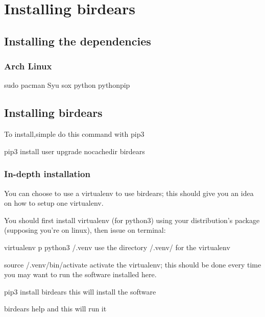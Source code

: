 \documentclass[letterpaper,10pt,english]{sphinxmanual}
\begin{document}
\chapter{Installing birdears}
\label{\detokenize{installing::doc}}\label{\detokenize{installing:installing-birdears}}

\section{Installing the dependencies}
\label{\detokenize{installing:installing-the-dependencies}}

\subsection{Arch Linux}
\label{\detokenize{installing:arch-linux}}
\begin{sphinxVerbatim}[commandchars=\\\{\}]
sudo pacman \PYGZhy{}Syu sox python python\PYGZhy{}pip
\end{sphinxVerbatim}


\section{Installing birdears}
\label{\detokenize{installing:id1}}
To install,simple do this command with pip3

\begin{sphinxVerbatim}[commandchars=\\\{\}]
pip3 install \PYGZhy{}\PYGZhy{}user \PYGZhy{}\PYGZhy{}upgrade \PYGZhy{}\PYGZhy{}no\PYGZhy{}cache\PYGZhy{}dir birdears
\end{sphinxVerbatim}


\subsection{In-depth installation}
\label{\detokenize{installing:in-depth-installation}}
You can choose to use a virtualenv to use birdears; this should give you
an idea on how to setup one virtualenv.

You should first install virtualenv (for python3) using your
distribution’s package (supposing you’re on linux), then issue on terminal:

\begin{sphinxVerbatim}[commandchars=\\\{\}]
virtualenv \PYGZhy{}p python3 \PYGZti{}/.venv \PYGZsh{} use the directory \PYGZti{}/.venv/ for the virtualenv

source \PYGZti{}/.venv/bin/activate   \PYGZsh{} activate the virtualenv; this should be done
                              \PYGZsh{} every time you may want to run the software
                              \PYGZsh{} installed here.

pip3 install birdears         \PYGZsh{} this will install the software

birdears \PYGZhy{}\PYGZhy{}help               \PYGZsh{} and this will run it
\end{sphinxVerbatim}
\end{document}
